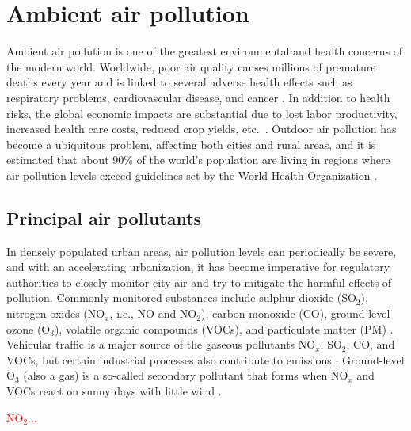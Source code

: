 \section{Ambient air pollution}

Ambient air pollution is one of the greatest environmental and health concerns of the modern world. Worldwide, poor air quality causes millions of premature deaths every year and is linked to several adverse health effects such as respiratory problems, cardiovascular disease, and cancer \cite{who2016}. In addition to health risks, the global economic impacts are substantial due to lost labor productivity, increased health care costs, reduced crop yields, etc.\ \cite{oecd2016}. Outdoor air pollution has become a ubiquitous problem, affecting both cities and rural areas, and it is estimated that about 90\% of the world's population are living in regions where air pollution levels exceed guidelines set by the World Health Organization \cite{who2016}. 

\subsection{Principal air pollutants}
\label{sec:airpollutants}
In densely populated urban areas, air pollution levels can periodically be severe, and with an accelerating urbanization, it has become imperative for regulatory authorities to closely monitor city air and try to mitigate the harmful effects of pollution. Commonly monitored substances include sulphur dioxide (SO$_2$), nitrogen oxides (NO$_x$, i.e., NO and NO$_2$), carbon monoxide (CO), ground-level ozone (O$_3$), volatile organic compounds (VOCs), and particulate matter (PM) \cite{VanLoon2010}. Vehicular traffic is a major source of the gaseous pollutants NO$_x$, SO$_2$, CO, and VOCs, but certain industrial processes also contribute to emissions \cite{VanLoon2010}. Ground-level O$_3$ (also a gas) is a so-called secondary pollutant that forms when NO$_x$ and VOCs react on sunny days with little wind \cite{VanLoon2010}. 

\textcolor{red}{NO$_2$...}

